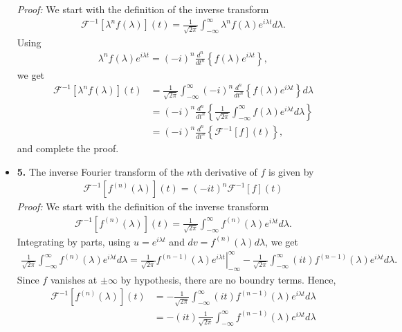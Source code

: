 \begin{questions}
\begin{solution}
\begin{itemize}
\textit{Proof:}
We start with the definition of the inverse transform
\begin{align*}
\mathcal{F}^{-1}[\lambda^nf(\lambda)](t)=\frac{1}{\sqrt{2\pi}}\int_{-\infty}^{\infty}\lambda^nf(\lambda)e^{i\lambda t}d\lambda.
\end{align*}
Using
\begin{align*}
\lambda^nf(\lambda)e^{i\lambda t}=(-i)^n\frac{d^n}{dt^n}\left\lbrace f(\lambda)e^{i\lambda t}\right\rbrace,
\end{align*}
we get
\begin{align*}
\mathcal{F}^{-1}[\lambda^nf(\lambda)](t)&=\frac{1}{\sqrt{2\pi}}\int_{-\infty}^{\infty}(-i)^n\frac{d^n}{dt^n}\left\lbrace f(\lambda)e^{i\lambda t}\right\rbrace d\lambda\\
&=(-i)^n\frac{d^n}{dt^n}\left\lbrace\frac{1}{\sqrt{2\pi}}\int_{-\infty}^{\infty} f(\lambda)e^{i\lambda t} d\lambda\right\rbrace\\
&=(-i)^n\frac{d^n}{dt^n}\left\lbrace \mathcal{F}^{-1}[f](t) \right\rbrace,
\end{align*}
and complete the proof.
\item \textbf{5.} The inverse Fourier transform of the $n$th derivative of $f$ is given by
\begin{align*}
\mathcal{F}^{-1}[f^{(n)}(\lambda)](t)=(-it)^n\mathcal{F}^{-1}[f](t)
\end{align*}
\textit{Proof:}
We start with the definition of the inverse transform
\begin{align*}
\mathcal{F}^{-1}[f^{(n)}(\lambda)](t)=\frac{1}{\sqrt{2\pi}}\int_{-\infty}^{\infty}f^{(n)}(\lambda)e^{i\lambda t}d\lambda.
\end{align*}
Integrating by parts, using $u=e^{i\lambda t}$ and $dv=f^{(n)}(\lambda)d\lambda$, we get
\begin{align*}
\frac{1}{\sqrt{2\pi}}\int_{-\infty}^{\infty}f^{(n)}(\lambda)e^{i\lambda t}d\lambda=\left.\frac{1}{\sqrt{2\pi}}f^{(n-1)}(\lambda)e^{i\lambda t}\right|_{-\infty}^{\infty}-\frac{1}{\sqrt{2\pi}}\int_{-\infty}^{\infty}(it)f^{(n-1)}(\lambda)e^{i\lambda t}d\lambda.
\end{align*}
Since $f$ vanishes at $\pm\infty$ by hypothesis, there are no boundry terms. Hence,
\begin{align*}
\mathcal{F}^{-1}[f^{(n)}(\lambda)](t)&=-\frac{1}{\sqrt{2\pi}}\int_{-\infty}^{\infty}(it)f^{(n-1)}(\lambda)e^{i\lambda t}d\lambda\\
&=-(it)\frac{1}{\sqrt{2\pi}}\int_{-\infty}^{\infty}f^{(n-1)}(\lambda)e^{i\lambda t}d\lambda\\

\end{align*}
\end{itemize}
\end{solution}
\end{questions}
